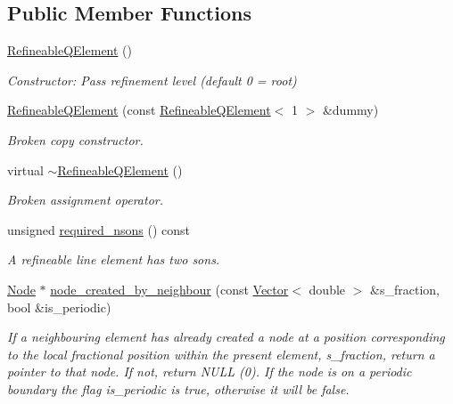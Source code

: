 \subsection*{Public Member Functions}
\begin{DoxyCompactItemize}
\item 
\hyperlink{classoomph_1_1RefineableQElement_3_011_01_4_a6b1dd333b6493916cc2b246cac0e00c9}{Refineable\+Q\+Element} ()
\begin{DoxyCompactList}\small\item\em Constructor\+: Pass refinement level (default 0 = root) \end{DoxyCompactList}\item 
\hyperlink{classoomph_1_1RefineableQElement_3_011_01_4_a2fefa3aae6512105d477884d34fee857}{Refineable\+Q\+Element} (const \hyperlink{classoomph_1_1RefineableQElement}{Refineable\+Q\+Element}$<$ 1 $>$ \&dummy)
\begin{DoxyCompactList}\small\item\em Broken copy constructor. \end{DoxyCompactList}\item 
virtual \hyperlink{classoomph_1_1RefineableQElement_3_011_01_4_abdf6ecc172f37b56378b3935c8a8bce5}{$\sim$\+Refineable\+Q\+Element} ()
\begin{DoxyCompactList}\small\item\em Broken assignment operator. \end{DoxyCompactList}\item 
unsigned \hyperlink{classoomph_1_1RefineableQElement_3_011_01_4_a2c57e01f88f507f63a55ef005f11d2ce}{required\+\_\+nsons} () const
\begin{DoxyCompactList}\small\item\em A refineable line element has two sons. \end{DoxyCompactList}\item 
\hyperlink{classoomph_1_1Node}{Node} $\ast$ \hyperlink{classoomph_1_1RefineableQElement_3_011_01_4_ad415f7f3dffe9e990dc690deed3a0666}{node\+\_\+created\+\_\+by\+\_\+neighbour} (const \hyperlink{classoomph_1_1Vector}{Vector}$<$ double $>$ \&s\+\_\+fraction, bool \&is\+\_\+periodic)
\begin{DoxyCompactList}\small\item\em If a neighbouring element has already created a node at a position corresponding to the local fractional position within the present element, s\+\_\+fraction, return a pointer to that node. If not, return N\+U\+LL (0). If the node is on a periodic boundary the flag is\+\_\+periodic is true, otherwise it will be false. \end{DoxyCompactList}\item 

\end{DoxyCompactItemize}
